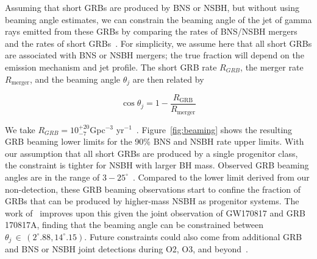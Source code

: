 Assuming that short \acp{GRB} are produced by \ac{BNS} or \ac{NSBH}, but
without using beaming angle estimates, we can constrain the beaming angle of the jet
of gamma rays emitted from these \acp{GRB} by comparing the rates of
\ac{BNS}/\ac{NSBH} mergers and the rates of
short \acp{GRB}~\citep{Chen:2012qh}.
For simplicity, we assume here that all short \acp{GRB} are associated with \ac{BNS}
or \ac{NSBH} mergers; the true fraction will
depend on the emission mechanism and jet profile.  The short \ac{GRB} rate $R_{GRB}$, the merger rate
$R_{\mathrm{merger}}$, and the beaming angle $\theta_j$ are then related by
%
\begin{linenomath*}
\begin{equation}\label{eq:beaming}
\cos \theta_j = 1 - \frac{R_{\mathrm{GRB}}}{R_{\mathrm{merger}}}
\end{equation}
\end{linenomath*}

%
We take $R_{GRB}=10^{+20}_{-7}$Gpc$^{-3}$
yr$^{-1}$~\citep{Coward:2012gn,Nakar:2005bs}.
Figure~\ref{fig:beaming} shows the resulting \ac{GRB} beaming lower limits for the
90\% \ac{BNS} and \ac{NSBH} rate upper limits.
With our assumption that all short \ac{GRB}s are produced by a single progenitor
class, the constraint is tighter for \ac{NSBH} with larger
\ac{BH} mass.
Observed \ac{GRB} beaming angles are in the range of
$3-25^{\circ}$~\citep{Fox:2005kv,Fong:2015oha,Grupe:2006uc,Soderberg:2006bn,2013ApJ...766...41S,2012ApJ...756...63M,2011A&A...531L...6N}.
Compared to the lower limit derived from our non-detection, these \ac{GRB}
beaming observations start to confine the fraction of \ac{GRB}s that can be
produced by higher-mass NSBH as progenitor systems. The work of~\cite{Williams_2018}
improves upon this given the joint observation of GW170817 and GRB 170817A, finding
that the beaming angle can be constrained between $\theta_j \, \in \, (2^{\circ}.88, 14^{\circ}.15)$.
Future constraints could also come from additional \ac{GRB} and \ac{BNS} or \ac{NSBH} joint
detections during \ac{O2}, \ac{O3}, and beyond~\citep{Dietz:2010eh,Regimbau:2014nxa, Clark:2014jpa, Williams_2018, PhysRevX.9.031040, Hayes:2019hso}.

\newpage

